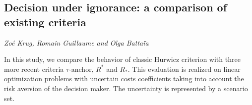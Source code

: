 \documentclass[../booklet.tex]{subfiles}
\begin{document}
\subsection[Decision under ignorance: a comparison of existing criteria. {\it Zoé Krug, Romain Guillaume and Olga Battaïa}]{Decision under ignorance: a comparison of existing criteria}
  

\begin{center}
  {\it Zoé Krug, Romain Guillaume and Olga Battaïa}
\end{center}



In this study, we compare the behavior of classic Hurwicz criterion with three more recent criteria $\tau$-anchor, $R^*$ and $R_*$. 
This evaluation is realized on linear optimization problems with uncertain costs coefficients taking into account the risk aversion of the decision maker. The uncertainty is represented by a scenario set. 

\end{document}

